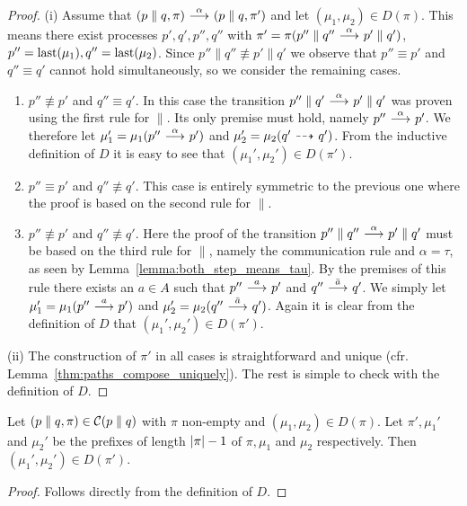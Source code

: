 \begin{proof}
    (i) Assume that $(p\parallel q, \pi) \ {\stackrel{{\alpha}}{\longrightarrow}}\  (p\parallel q, \pi')$ and let
    $(\mu_1,\mu_2)\in D(\pi)$. This means there exist processes $p',q',p'',q''$
    with $\pi' = \pi(p''\parallel q'' \ {\stackrel{{\alpha}}{\longrightarrow}}\  p'\parallel q')$,
    $p''=\operatorname{last}(\mu_1), q''=\operatorname{last}(\mu_2)$.
    Since $p''\parallel q'' \not\equiv
    p'\parallel q'$ we observe that $p''\equiv p'$ and $q''\equiv q'$ cannot hold
    simultaneously, so we consider the remaining cases.
    \begin{enumerate}
        \item $p''\not\equiv p'$ and $q''\equiv q'$. In this case the transition
            $p''\parallel q' \ {\stackrel{{\alpha}}{\longrightarrow}}\  p'\parallel q'$ was proven using the first
            rule for $\parallel$. Its only premise must hold, namely $p''\ {\stackrel{{\alpha}}{\longrightarrow}}\  p'$.
            We therefore let $\mu_1' = \mu_1(p''\ {\stackrel{{\alpha}}{\longrightarrow}}\ p')$ and $\mu_2' = \mu_2
            (q' \ {\stackrel{_{}}{\dashrightarrow}}\  q')$. From the inductive definition of $D$ it is easy to see
            that $(\mu_1',\mu_2') \in D(\pi')$.
        \item $p''\equiv p'$ and $q''\not\equiv q'$. This case is entirely symmetric
            to the previous one where the proof is based on the second rule for $\parallel$.
        \item $p''\not\equiv p'$ and $q''\not\equiv q'$. Here the proof
            of the transition $p''\parallel q'' \ {\stackrel{{\alpha}}{\longrightarrow}}\  p'\parallel q'$ must be based
            on the third rule for $\parallel$, 
            namely the communication rule and $\alpha=\tau$, as seen by
            Lemma~\ref{lemma:both_step_means_tau}. By the premises of this rule there
            exists an $a\in A$ such that $p''\ {\stackrel{{a}}{\longrightarrow}}\ p'$ and $q''\ {\stackrel{{\bar{a}}}{\longrightarrow}}\ q'$. We simply
            let $\mu_1' = \mu_1(p''\ {\stackrel{{a}}{\longrightarrow}}\ p')$ and $\mu_2' = \mu_2(q''\ {\stackrel{{\bar{a}}}{\longrightarrow}}\ q')$.
            Again it is clear from the definition of $D$ that $(\mu_1',\mu_2')\in D(\pi')$.
    \end{enumerate}

    (ii) The construction of $\pi'$ in all cases is straightforward and unique
    (cfr. Lemma~\ref{thm:paths_compose_uniquely}). The rest is simple to check
    with the definition of $D$.
\end{proof}

\begin{lemma}\label{lemma:removing_last_trans}
    Let $(p\parallel q,\pi) \in \mathcal{C}(p\parallel q)$ with $\pi$ non-empty and $(\mu_1,\mu_2)
    \in D(\pi)$. Let $\pi',\mu_1'$ and $\mu_2'$ be the prefixes of length $|\pi|-1$ of $\pi,
    \mu_1$ and $\mu_2$ respectively. Then $(\mu_1',\mu_2') \in D(\pi')$.
\end{lemma}
\begin{proof}
    Follows directly from the definition of $D$.
\end{proof}

